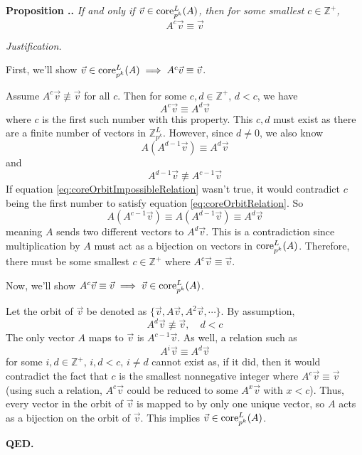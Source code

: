 \documentclass[a4paper, 12pt, reqno]{amsart}
\newcommand\core[3]{\textup{core}_{#1}^{#2}(#3)}
\newcounter{propcounter}[section]
\newenvironment{proposition}[1]
{
	\refstepcounter{propcounter}
	\textbf{Proposition \thesection.\thepropcounter.} \emph{#1}
	
	\emph{Justification.}
}
{
	\textbf{QED.} \\
}
\begin{document}
		\begin{proposition}{If and only if $\vec{v} \in \core{p^k}{L}{A}$, then for some smallest $c \in \mathds{Z}^+$, 
		\[
			A^c\vec{v} \equiv \vec{v}
		\]}
			\label{prop:coreOrbits}
			First, we'll show $\vec{v} \in \core{p^k}{L}{A} \implies A^c\vec{v} \equiv \vec{v}$.
			
			Assume $A^c\vec{v} \not\equiv \vec{v}$ for all $c$. Then for some $c,d \in \mathds{Z}^+, \, d < c$, we have
			\begin{equation}
				\label{eq:coreOrbitRelation}
				A^c\vec{v} \equiv A^d\vec{v}
			\end{equation}
			where $c$ is the first such number with this property. This $c,d$ must exist as there are a finite number of vectors in $\mathds{Z}_{p^k}^L$. However, since 
			$d \neq 0$, we also know
			\[
				A(A^{d-1}\vec{v}) \equiv A^d\vec{v}
			\]
			and
			\begin{equation}
				\label{eq:coreOrbitImpossibleRelation}
				A^{d-1}\vec{v} \not\equiv A^{c-1}\vec{v}
			\end{equation}
			If equation \ref{eq:coreOrbitImpossibleRelation} wasn't true, it would contradict $c$ being the first number to satisfy equation \ref{eq:coreOrbitRelation}. So
			\[
				A(A^{c-1}\vec{v}) \equiv A(A^{d-1}\vec{v}) \equiv A^d\vec{v}
			\]
			meaning $A$ sends two different vectors to $A^d\vec{v}$. This is a contradiction since multiplication by $A$ must act as a bijection on vectors in 
			$\core{p^k}{L}{A}$.	Therefore, there must be some smallest $c \in \mathds{Z}^+$ where $A^c\vec{v} \equiv \vec{v}$.
			
			Now, we'll show $A^c\vec{v} \equiv \vec{v} \implies \vec{v} \in \core{p^k}{L}{A}$.
			
			Let the orbit of $\vec{v}$ be denoted as $\{\vec{v}, A\vec{v}, A^2\vec{v}, \cdots\}$. By assumption,
			\[
				A^d\vec{v} \not\equiv \vec{v}, \quad d < c 
			\]
			The only vector $A$ maps to $\vec{v}$ is $A^{c-1}\vec{v}$. As well, a relation such as
			\[
				A^i\vec{v} \equiv A^d\vec{v}
			\]
			for some $i, d \in \mathds{Z}^+,\, i, d < c,\, i \neq d$ cannot exist as, if it did, then it would contradict the fact that $c$ is the smallest nonnegative 
			integer where $A^c\vec{v} \equiv \vec{v}$ (using such a relation, $A^c\vec{v}$ could be reduced to some $A^x\vec{v}$ with $x < c$). Thus, every vector in the 
			orbit of $\vec{v}$ is mapped to by only one unique vector, so $A$ acts as a bijection on the orbit of $\vec{v}$. This implies $\vec{v} \in \core{p^k}{L}{A}$.
		\end{proposition}
		
\end{document}
